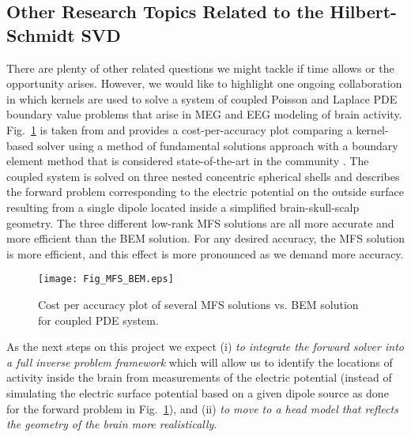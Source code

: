 \subsection{Other Research Topics Related to the Hilbert-Schmidt SVD}\label{SecMEEG}
There are plenty of other related questions we might tackle if time allows or the opportunity arises. However, we would like to highlight one ongoing collaboration in which kernels are used to solve a system of coupled Poisson and Laplace PDE boundary value problems that arise in MEG and EEG modeling of brain activity. Fig.~\ref{Fig_MFS_BEM} is taken from \citep{AFFGM13} and provides a cost-per-accuracy plot comparing a kernel-based solver using a method of fundamental solutions approach with a boundary element method that is considered state-of-the-art in the community \citep{fieldtrip11}. The coupled system is solved on three nested concentric spherical shells and describes the forward problem corresponding to the electric potential on the outside surface resulting from a single dipole located inside a simplified brain-skull-scalp geometry. The three different low-rank MFS solutions are all more accurate and more efficient than the BEM solution. For any desired accuracy, the MFS solution is more efficient, and this effect is more pronounced as we demand more accuracy.

\begin{figure}[h]
    \centering
    \texttt{[image: Fig\_MFS\_BEM.eps]}
\caption{Cost per accuracy plot of several MFS solutions vs. BEM solution for coupled PDE system.}\label{Fig_MFS_BEM}
\end{figure}

As the next steps on this project we expect (i) \emph{to integrate the forward solver into a full inverse problem framework} which will allow us to identify the locations of activity inside the brain from measurements of the electric potential (instead of simulating the electric surface potential based on a given dipole source as done for the forward problem in Fig.~\ref{Fig_MFS_BEM}), and (ii) \emph{to move to a head model that reflects the geometry of the brain more realistically}. 